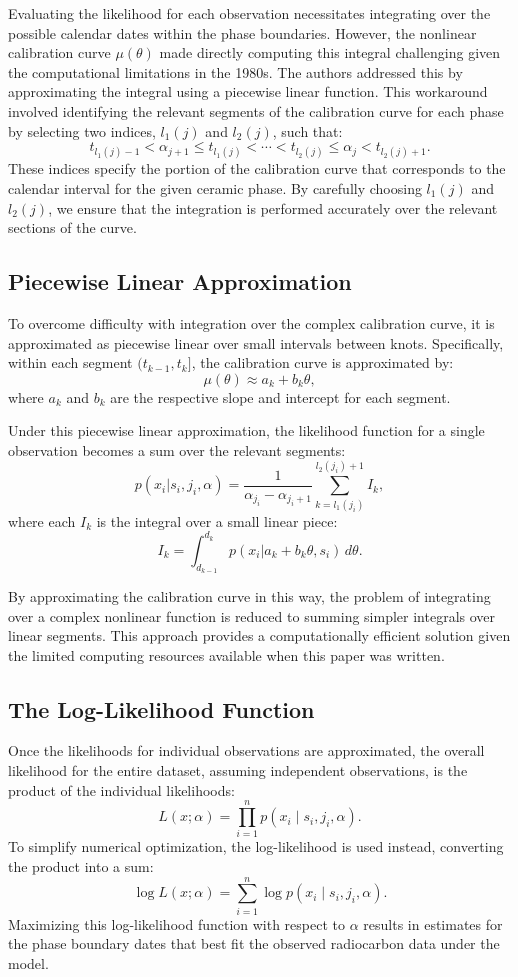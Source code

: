 \documentclass{article}
\begin{document}
Evaluating the likelihood for each observation necessitates integrating over the possible calendar dates within the phase boundaries. However, the  nonlinear calibration curve $\mu(\theta)$ made directly computing this integral challenging given the computational limitations in the 1980s. The authors addressed this by approximating the integral using a piecewise linear function. This workaround involved identifying the relevant segments of the calibration curve for each phase by selecting two indices, $l_1(j)$ and $l_2(j)$, such that:
\[
t_{l_1(j)-1} < \alpha_{j+1} \le t_{l_1(j)} < \cdots < t_{l_2(j)} \le \alpha_j < t_{l_2(j)+1}.
\]
These indices specify the portion of the calibration curve that corresponds to the calendar interval for the given ceramic phase. By carefully choosing $l_1(j)$ and $l_2(j)$, we ensure that the integration is performed accurately over the relevant sections of the curve.

\subsection{Piecewise Linear Approximation}
To overcome difficulty with integration over the complex calibration curve, it is approximated as piecewise linear over small intervals between knots. Specifically, within each segment $(t_{k-1}, t_k]$, the calibration curve is approximated by:
\[
\mu(\theta) \approx a_k + b_k \theta,
\]
where $a_k$ and $b_k$ are the respective slope and intercept for each segment.

Under this piecewise linear approximation, the likelihood function for a single observation becomes a sum over the relevant segments:
\[
p(x_i|s_i,j_i,\alpha) = \frac{1}{\alpha_{j_i} - \alpha_{j_i+1}} \sum_{k=l_1(j_i)}^{l_2(j_i)+1} I_k,
\]
where each $I_k$ is the integral over a small linear piece:
\[
I_k = \int_{d_{k-1}}^{d_k} p(x_i | a_k + b_k \theta, s_i) \, d\theta.
\]

By approximating the calibration curve in this way, the problem of integrating over a complex nonlinear function is reduced to summing simpler integrals over linear segments. This approach provides a computationally efficient solution given the limited computing resources available when this paper was written.

\subsection{The Log-Likelihood Function}
Once the likelihoods for individual observations are approximated, the overall likelihood for the entire dataset, assuming independent observations, is the product of the individual likelihoods:
\[
L(x; \alpha) = \prod_{i=1}^n p(x_i \mid s_i, j_i, \alpha).
\]
To simplify numerical optimization, the log-likelihood is used instead, converting the product into a sum:
\[
\log L(x;\alpha) = \sum_{i=1}^n \log p(x_i \mid s_i, j_i, \alpha).
\]
Maximizing this log-likelihood function with respect to $\alpha$ results in estimates for the phase boundary dates that best fit the observed radiocarbon data under the model.
\end{document}
